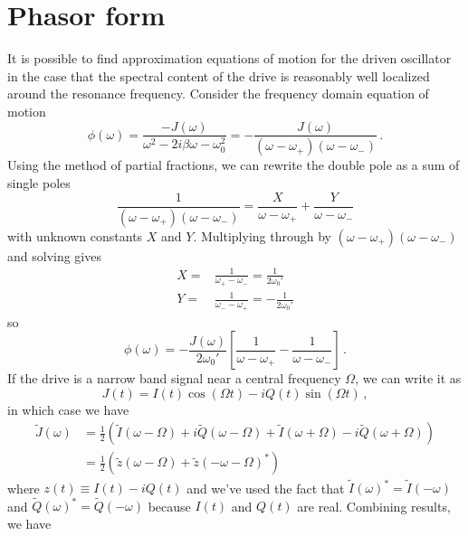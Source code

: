 \documentclass{article}
\begin{document}
\section{Phasor form}

It is possible to find approximation equations of motion for the driven oscillator in the case that the spectral content of the drive is reasonably well localized around the resonance frequency.
Consider the frequency domain equation of motion
\begin{equation}
  \phi(\omega) = \frac{-J(\omega)}{\omega^2 - 2 i \beta \omega - \omega_0^2}
  = - \frac{J(\omega)}{(\omega - \omega_+)(\omega - \omega_-)} \, .
\end{equation}
Using the method of partial fractions, we can rewrite the double pole as a sum of single poles
\begin{equation}
  \frac{1}{(\omega - \omega_+)(\omega - \omega_-)}
  = \frac{X}{\omega - \omega_+} + \frac{Y}{\omega - \omega_-}
\end{equation}
with unknown constants $X$ and $Y$.
Multiplying through by $(\omega - \omega_+)(\omega - \omega_-)$ and solving gives
\begin{align*}
  X =& \frac{1}{\omega_+ - \omega_-} =   \frac{1}{2 \omega_0'} \\
  Y =& \frac{1}{\omega_- - \omega_+} = - \frac{1}{2 \omega_0'}
\end{align*}
so
\begin{equation}
  \phi(\omega) = - \frac{J(\omega)}{2 \omega_0'}
  \left[ \frac{1}{\omega - \omega_+} - \frac{1}{\omega - \omega_-} \right] \, .
\end{equation}
If the drive is a narrow band signal near a central frequency $\Omega$, we can write it as
\begin{equation}
  J(t) = I(t) \cos(\Omega t) - i Q(t) \sin(\Omega t) \, ,
\end{equation}
in which case we have
\begin{align*}
  \tilde{J}(\omega)
  &= \frac{1}{2} \left(
      \tilde{I}(\omega - \Omega) + i \tilde{Q}(\omega - \Omega)
    + \tilde{I}(\omega + \Omega) - i \tilde{Q}(\omega + \Omega)
  \right) \\
  &= \frac{1}{2} \left(
      \tilde{z}(\omega - \Omega) + \tilde{z}(-\omega - \Omega)^*
  \right)
\end{align*}
where $z(t) \equiv I(t) - i Q(t)$ and we've used the fact that $\tilde{I}(\omega)^* = \tilde{I}(-\omega)$ and $\tilde{Q}(\omega)^* = \tilde{Q}(-\omega)$ because $I(t)$ and $Q(t)$ are real.
Combining results, we have
\end{document}
